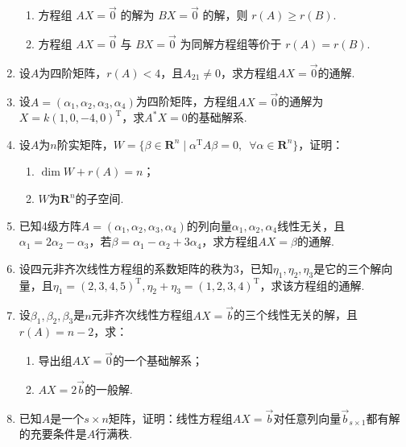 \begin{enumerate}
\begin{enumerate}[resume*]
              \item 方程组 $AX=\vec{0}$ 的解为 $BX=\vec{0}$ 的解，则 $r(A) \geqslant r(B)$.

              \item 方程组 $AX=\vec{0}$ 与 $BX=\vec{0}$ 为同解方程组等价于 $r(A)=r(B)$.
          \end{enumerate}

    \item 设$A$为四阶矩阵，$r(A)<4$，且$A_{21}\neq 0$，求方程组$AX=\vec{0}$的通解.

    \item 设$A=(\alpha_1,\alpha_2,\alpha_3,\alpha_4)$为四阶矩阵，方程组$AX=\vec{0}$的通解为$X=k(1,0,-4,0)^\mathrm{T}$，求$A^*X=0$的基础解系.

    \item 设$A$为$n$阶实矩阵，$W=\{\beta\in\mathbf{R}^n \mid \alpha^\mathrm{T}A\beta=0,\enspace \forall \alpha\in\mathbf{R}^n\}$，证明：
          \begin{enumerate}
              \item $\dim W+r(A)=n$；

              \item $W$为$\mathbf{R}^n$的子空间.
          \end{enumerate}

    \item 已知4级方阵$A=(\alpha_1,\alpha_2,\alpha_3,\alpha_4)$的列向量$\alpha_1,\alpha_2,\alpha_4$线性无关，且$\alpha_1=2\alpha_2-\alpha_3$，若$\beta=\alpha_1-\alpha_2+3\alpha_4$，求方程组$AX=\beta$的通解.

    \item 设四元非齐次线性方程组的系数矩阵的秩为3，已知$\eta_1,\eta_2,\eta_3$是它的三个解向量，且$\eta_1=(2,3,4,5)^\mathrm{T},\eta_2+\eta_3=(1,2,3,4)^\mathrm{T}$，求该方程组的通解.

    \item 设$\beta_1,\beta_2,\beta_3$是$n$元非齐次线性方程组$AX=\vec{b}$的三个线性无关的解，且$r(A)=n-2$，求：
          \begin{enumerate}
              \item 导出组$AX=\vec{0}$的一个基础解系；

              \item $AX=2\vec{b}$的一般解.
          \end{enumerate}

    \item 已知$A$是一个$s\times n$矩阵，证明：线性方程组$AX=\vec{b}$对任意列向量$\vec{b}_{s\times 1}$都有解的充要条件是$A$行满秩.


\end{enumerate}
